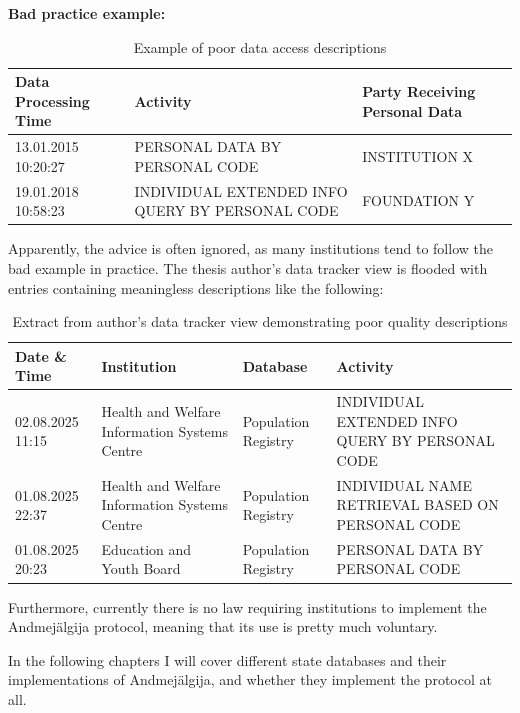 \textbf{Bad practice example:}

\begin{table}[H]
\centering
\begin{tabular}{|p{3cm}|p{6cm}|p{4cm}|}
\hline
\textbf{Data Processing Time} & \textbf{Activity} & \textbf{Party Receiving Personal Data} \\
\hline
13.01.2015 10:20:27 & PERSONAL DATA BY PERSONAL CODE & INSTITUTION X \\
\hline
19.01.2018 10:58:23 & INDIVIDUAL EXTENDED INFO QUERY BY PERSONAL CODE & FOUNDATION Y \\
\hline
\end{tabular}
\caption{Example of poor data access descriptions}
\end{table}

Apparently, the advice is often ignored, as many institutions tend to follow the bad example in practice. The thesis author's data tracker view is flooded with entries containing meaningless descriptions like the following:

\begin{table}[H]
\centering
\begin{tabular}{|p{2.5cm}|p{5cm}|p{3cm}|p{3.5cm}|}
\hline
\textbf{Date \& Time} & \textbf{Institution} & \textbf{Database} & \textbf{Activity} \\
\hline
02.08.2025 11:15 & Health and Welfare Information Systems Centre & Population Registry & INDIVIDUAL EXTENDED INFO QUERY BY PERSONAL CODE \\
\hline
01.08.2025 22:37 & Health and Welfare Information Systems Centre & Population Registry & INDIVIDUAL NAME RETRIEVAL BASED ON PERSONAL CODE \\
\hline
01.08.2025 20:23 & Education and Youth Board & Population Registry & PERSONAL DATA BY PERSONAL CODE \\
\hline
\end{tabular}
\caption{Extract from author's data tracker view demonstrating poor quality descriptions}
\end{table}

Furthermore, currently there is no law requiring institutions to implement the Andmejälgija protocol, meaning that its use is pretty much voluntary.

In the following chapters I will cover different state databases and their implementations of Andmejälgija, and whether they implement the protocol at all.